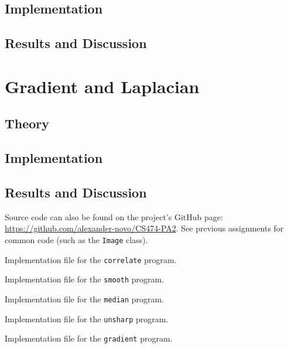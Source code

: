 \documentclass[headings=optiontoheadandtoc,listof=totoc,parskip=full]{scrartcl}
\newenvironment{longlisting}{\captionsetup{type=listing}}{}
\begin{document}
\subsection{Implementation}


\subsection{Results and Discussion}
\label{sec:unsharp-results}


\section{Gradient and Laplacian}
\label{sec:gradient}

\subsection{Theory}
\label{sec:gradient-theory}


\subsection{Implementation}
\label{sec:gradient-implementation}


\subsection{Results and Discussion}
\label{sec:gradient-results}

\clearpage
\listoflistings

Source code can also be found on the project's GitHub page: \url{https://github.com/alexander-novo/CS474-PA2}. See previous assignments for common code (such as the \texttt{Image} class).

\begin{longlisting}
	\caption{Implementation file for the \texttt{correlate} program.}
	\label{lst:correlate}
\end{longlisting}

\begin{longlisting}
	\caption{Implementation file for the \texttt{smooth} program.}
	\label{lst:smooth}
\end{longlisting}

\begin{longlisting}
	\caption{Implementation file for the \texttt{median} program.}
	\label{lst:median}
\end{longlisting}

\begin{longlisting}
	\caption{Implementation file for the \texttt{unsharp} program.}
	\label{lst:unsharp}
\end{longlisting}

\begin{longlisting}
	\caption{Implementation file for the \texttt{gradient} program.}
	\label{lst:gradient}
\end{longlisting}
\end{document}
